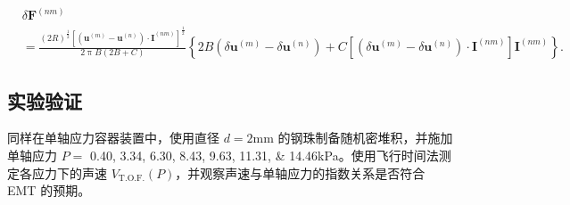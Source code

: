 \begin{equation}
  \begin{aligned}
  &\delta\mathbf{F}^{(nm)} \\
  &= \frac{(2R)^{\frac{1}{2}}\left[\left(\mathbf{u}^{(m)} - \mathbf{u}^{(n)}\right)\cdot\mathbf{I}^{(nm)}\right]^{\frac{1}{2}}}{2\uppi B(2B+C)}\left\{2B\left(\delta\mathbf{u}^{(m)} - \delta\mathbf{u}^{(n)}\right) + C\left[\left(\delta\mathbf{u}^{(m)} - \delta\mathbf{u}^{(n)}\right)\cdot\mathbf{I}^{(nm)}\right]\mathbf{I}^{(nm)}\right\}.
  \end{aligned}
\end{equation}

\subsection{实验验证}\label{sec:stress_velocity_relation}

同样在单轴应力容器装置中，使用直径 $d=2\unit{\milli\meter}$ 的钢珠制备随机密堆积，并施加单轴应力 $P=$ \numlist{0.40;3.34;6.30;8.43;9.63;11.31;14.46}\unit{\kilo\pascal}。使用飞行时间法测定各应力下的声速 $V_{\text{T.O.F.}}(P)$，并观察声速与单轴应力的指数关系是否符合 EMT 的预期。


